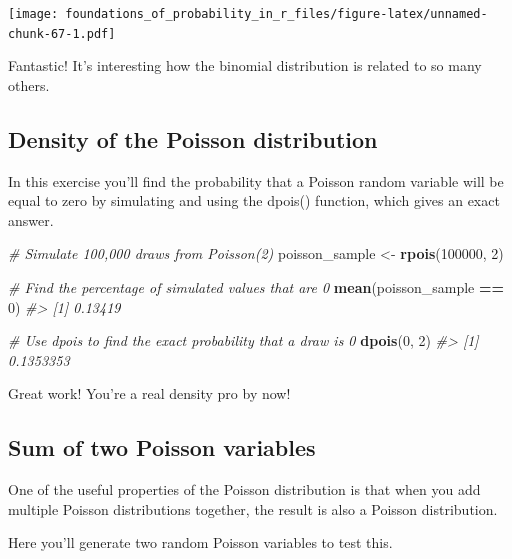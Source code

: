 \documentclass[]{article}
\newenvironment{Shaded}{\begin{snugshade}}{\end{snugshade}}
\newcommand{\CommentTok}[1]{\textcolor[rgb]{0.56,0.35,0.01}{\textit{#1}}}
\newcommand{\DecValTok}[1]{\textcolor[rgb]{0.00,0.00,0.81}{#1}}
\newcommand{\KeywordTok}[1]{\textcolor[rgb]{0.13,0.29,0.53}{\textbf{#1}}}
\newcommand{\NormalTok}[1]{#1}
\newcommand{\OperatorTok}[1]{\textcolor[rgb]{0.81,0.36,0.00}{\textbf{#1}}}
\newcommand{\StringTok}[1]{\textcolor[rgb]{0.31,0.60,0.02}{#1}}
\begin{document}
\texttt{[image: foundations\_of\_probability\_in\_r\_files/figure-latex/unnamed-chunk-67-1.pdf]}

Fantastic! It's interesting how the binomial distribution is related to
so many others.

\hypertarget{density-of-the-poisson-distribution}{%
\subsection{Density of the Poisson
distribution}\label{density-of-the-poisson-distribution}}

In this exercise you'll find the probability that a Poisson random
variable will be equal to zero by simulating and using the dpois()
function, which gives an exact answer.

\begin{Shaded}
\begin{Highlighting}[]
\CommentTok{# Simulate 100,000 draws from Poisson(2)}
\NormalTok{poisson_sample <-}\StringTok{ }\KeywordTok{rpois}\NormalTok{(}\DecValTok{100000}\NormalTok{, }\DecValTok{2}\NormalTok{)}

\CommentTok{# Find the percentage of simulated values that are 0}
\KeywordTok{mean}\NormalTok{(poisson_sample }\OperatorTok{==}\StringTok{ }\DecValTok{0}\NormalTok{)}
\CommentTok{#> [1] 0.13419}

\CommentTok{# Use dpois to find the exact probability that a draw is 0}
\KeywordTok{dpois}\NormalTok{(}\DecValTok{0}\NormalTok{, }\DecValTok{2}\NormalTok{)}
\CommentTok{#> [1] 0.1353353}
\end{Highlighting}
\end{Shaded}

Great work! You're a real density pro by now!

\hypertarget{sum-of-two-poisson-variables}{%
\subsection{Sum of two Poisson
variables}\label{sum-of-two-poisson-variables}}

One of the useful properties of the Poisson distribution is that when
you add multiple Poisson distributions together, the result is also a
Poisson distribution.

Here you'll generate two random Poisson variables to test this.
\end{document}

